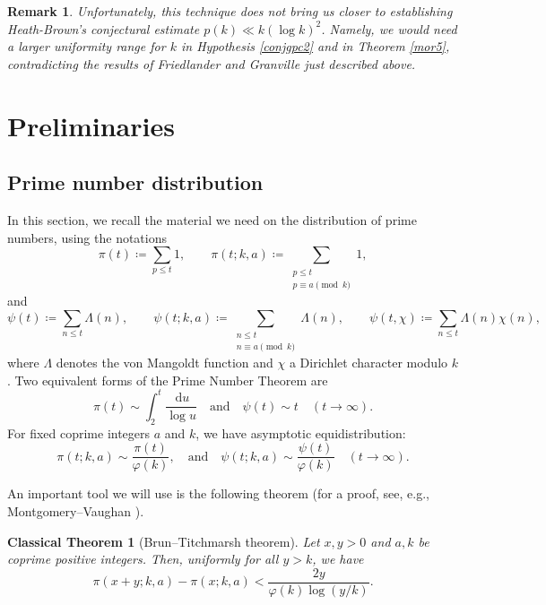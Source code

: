 \documentclass[pdflatex]{sn-jnl}%
\newcommand{\dx}{\mathrm{d}}
\theoremstyle{sltheorems}
\newtheorem{CThm}{Classical Theorem}
\theoremstyle{plainrem}
\newtheorem{Rem}{Remark}
\theoremstyle{definition}
\begin{document}
\begin{Rem}
Unfortunately, this technique does not bring us closer
to establishing Heath-Brown's conjectural estimate $p(k)\ll k (\log k)^2$.
Namely, we would need a larger uniformity range for $k$ in Hypothesis \ref{conjgpc2}
and in Theorem \ref{mor5}, 
contradicting the results of Friedlander and Granville
\cite{FriedlanderG1989} just described above.
\end{Rem}
 

\section{Preliminaries}\label{pre}
\subsection{Prime number distribution}
In this section, we recall the material we need on the distribution of prime numbers, using the notations
\begin{equation*}
\pi(t) \coloneq \sum_{p \le  t} 1, \quad \quad
\pi(t;k,a) \coloneq \sum_{\substack{p \le  t \\ p \equiv a  \pmod{k}}} 1,
\end{equation*}
and
\begin{equation*}
\psi(t) \coloneq \sum_{n \le  t} \Lambda(n), \quad \quad
\psi(t;k,a) \coloneq \sum_{\substack{n \le  t \\ n \equiv a  \pmod{k}}} \Lambda(n),  
\quad \quad 
\psi(t,\chi) \coloneq \sum_{n \le t} \Lambda(n) \chi(n),
\end{equation*}
%
where $\Lambda$ denotes the von Mangoldt function and $\chi$ a Dirichlet character
modulo $k$.
Two equivalent forms of the Prime Number Theorem are
%
\begin{equation*}
\pi(t)\sim
\int_{2}^{t} \frac{\, \dx u}{\log u}
\quad
\textrm{and}
\quad
\psi(t)\sim t
\quad (t\to \infty).
\end{equation*}
%
For fixed coprime integers $a$ and $k$, we have asymptotic equidistribution: 
%
\begin{equation*}
\pi(t;k,a)\sim \frac{\pi(t)}{\varphi(k)},
\quad
\textrm{and}
\quad
\psi(t;k,a)\sim \frac{\psi(t)}{\varphi(k)}
\quad (t\to \infty).
\end{equation*}
% 

An important tool we will use is the following theorem (for a proof, see, e.g.,
Montgomery--Vaughan \cite[Sect.~3--6]{MVsieve}).
\begin{CThm}[Brun--Titchmarsh theorem]
\label{BT-thm}
Let $x,y>0$ and $a,k$ be coprime positive integers.
Then, uniformly for all $y>k$, we have
\begin{equation*} 
\pi(x+y;k,a) - \pi(x;k,a) < \frac{2y}{\varphi(k) \log(y/k)}.
\end{equation*}
\end{CThm}
\end{document}
